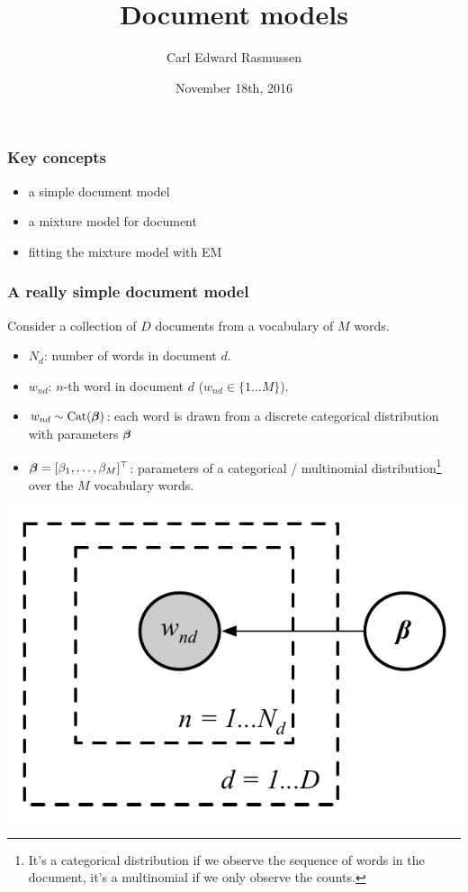 

\title{Document models}
\author{Carl Edward Rasmussen}
\date{November 18th, 2016}




\begin{frame}
\titlepage
\end{frame}


\begin{frame}
\frametitle{Key concepts}

\begin{itemize}
\item a simple document model
\item a mixture model for document
\item fitting the mixture model with EM
\end{itemize}
\end{frame}


\begin{frame}
\frametitle{A really simple document model}

Consider a collection of $D$ documents from a vocabulary of $M$  words.

\parbox{0.7\linewidth}{
\begin{itemize}
\item $N_d$: number of words in document $d$.
\item $w_{nd}$: $n$-th word in document $d$ ($w_{nd}\in\{1 \ldots M\}$).
\item $w_{nd} \sim \rm{Cat}(\boldsymbol{\beta})$: each word is drawn from a
  discrete categorical distribution with parameters $\boldsymbol{\beta}$
\item $\boldsymbol{\beta}=[\beta_1,\ldots,\beta_M]^\top$: parameters of a
  categorical / multinomial distribution\footnote{It's a categorical
    distribution if we observe the sequence of words in the document,
    it's a multinomial if we only observe the counts.} over the $M$ vocabulary words.
\end{itemize}
}
%
\parbox{0.29\linewidth}{
\hfill
\includegraphics[width=\linewidth]{categorical_model}
}

\end{frame}


